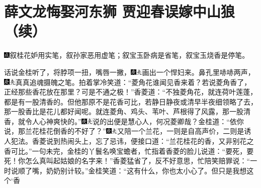 
\chapter{薛文龙悔娶河东狮 贾迎春误嫁中山狼（续）}

{\includegraphics[width=3mm]{../Images/00005}\kaishu 叙桂花妒用实笔，叙孙家恶用虚笔；叙宝玉卧病是省笔，叙宝玉烧香是停笔。}

话说金桂听了，将脖项一扭，嘴唇一撇，{\includegraphics[width=3mm]{../Images/00004}\includegraphics[width=3mm]{../Images/00012}\footnotesize \kaishu 画出一个悍妇来。}鼻孔里哧哧两声，{\includegraphics[width=3mm]{../Images/00004}\includegraphics[width=3mm]{../Images/00012}\footnotesize \kaishu 真真追魂摄魄之笔。}拍着掌冷笑道：``菱角花谁闻见香来着？若说菱角香了，正经那些香花放在那里？可是不通之极！''香菱道：``不独菱角花，就连荷叶莲蓬，都是有一股清香的。但他那原不是花香可比，若静日静夜或清早半夜细领略了去，那一股香比是花儿都好闻呢。就连菱角、鸡头、苇叶、芦根得了风露，那一股清香，就令人心神爽快的。''{\includegraphics[width=3mm]{../Images/00004}\includegraphics[width=3mm]{../Images/00012}\footnotesize \kaishu 说的出便是慧心人，何况菱卿哉？}金桂道：``依你说，那兰花桂花倒香的不好了？''{\includegraphics[width=3mm]{../Images/00004}\includegraphics[width=3mm]{../Images/00012}\footnotesize \kaishu 又陪一个兰花，一则是自高声价，二则是诱人犯法。}香菱说到热闹头上，忘了忌讳，便接口道：``兰花桂花的香，又非别花之香可比。''一句未完，金桂的丫鬟名唤宝蟾者，忙指着香菱的脸儿说道：``要死，要死！你怎么真叫起姑娘的名字来！''香菱猛省了，反不好意思，忙陪笑赔罪说：``一时说顺了嘴，奶奶别计较。''金桂笑道：``这有什么，你也太小心了。但只是我想这个`香